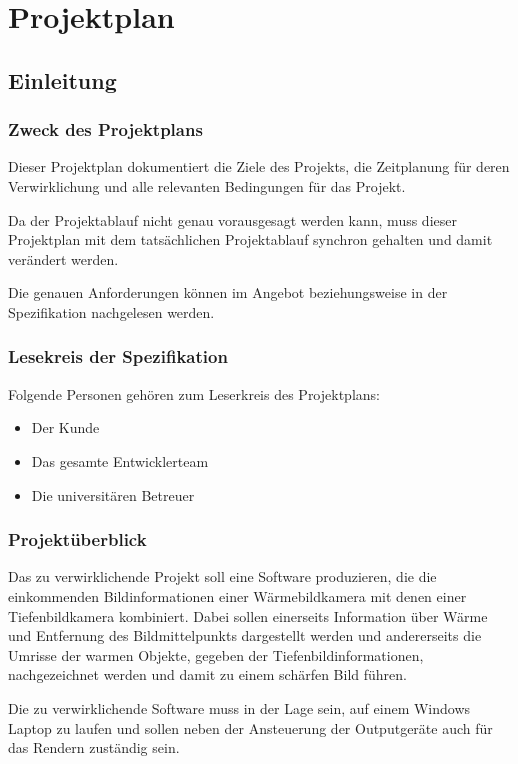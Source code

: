 
\chapter{Projektplan}
\label{chap:projektplan}

\section{Einleitung}

\subsection{Zweck des Projektplans}
Dieser Projektplan dokumentiert die Ziele des Projekts, die Zeitplanung für deren Verwirklichung und alle relevanten Bedingungen für das Projekt.

Da der Projektablauf nicht genau vorausgesagt werden kann, muss dieser Projektplan mit dem tatsächlichen Projektablauf synchron gehalten und damit verändert werden.

Die genauen Anforderungen können im Angebot beziehungsweise in der Spezifikation nachgelesen werden.

\subsection{Lesekreis der Spezifikation}
Folgende Personen gehören zum Leserkreis des Projektplans:
\begin{itemize}
	\item Der Kunde
	\item Das gesamte Entwicklerteam
	\item Die universitären Betreuer
\end{itemize}

\subsection{Projektüberblick}
Das zu verwirklichende Projekt soll eine Software produzieren, die die einkommenden Bildinformationen einer Wärmebildkamera mit denen einer Tiefenbildkamera kombiniert.
Dabei sollen einerseits Information über Wärme und Entfernung des Bildmittelpunkts dargestellt werden und andererseits die Umrisse der warmen Objekte, gegeben der Tiefenbildinformationen, nachgezeichnet werden und damit zu einem schärfen Bild führen.

Die zu verwirklichende Software muss in der Lage sein, auf einem Windows Laptop zu laufen und sollen neben der Ansteuerung der Outputgeräte auch für das Rendern zuständig sein.

